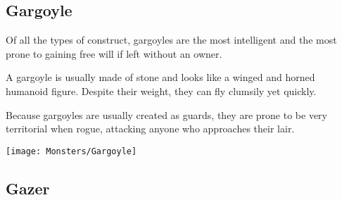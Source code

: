 \begin{multicols*}{2}
\subsection{Gargoyle}

Of all the types of construct, gargoyles are the most intelligent and the most prone to gaining free will if left without an owner.

A gargoyle is usually made of stone and looks like a winged and horned humanoid figure. Despite their weight, they can fly clumsily yet quickly.

Because gargoyles are usually created as guards, they are prone to be very territorial when rogue, attacking anyone who approaches their lair.

\texttt{[image: Monsters/Gargoyle]}

\subsection{Gazer}
\end{multicols*}
